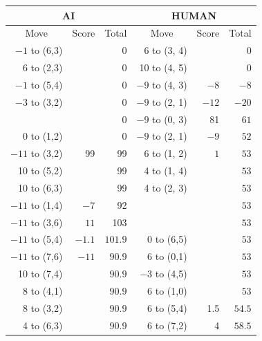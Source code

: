 \begin{appendices}
\begin{table}[H]
    \centering
    \begin{tabular}{rrrrrr}
        \hline
        \multicolumn{3}{c}{AI}        & \multicolumn{3}{c}{HUMAN}     \\ \hline
        \multicolumn{1}{c}{Move}         & \multicolumn{1}{c}{Score} & \multicolumn{1}{c}{Total} & \multicolumn{1}{c}{Move}         & \multicolumn{1}{c}{Score} & \multicolumn{1}{c}{Total} \\ \hline
          $-1$ to (6,3) &     &  0    &   6 to (3, 4) &      &  0    \\ \hline
          6 to (2,3) &     &  0    &   10 to (4, 5) &      &  0    \\ \hline
         $-1$ to (5,4) &     &  0    &  $-9$ to (4, 3) & $-8$   &  $-8$    \\ \hline
         $-3$ to (3,2) &     &  0    &  $-9$ to (2, 1) & $-12$   &  $-20$    \\ \hline
                      &     &  0    &  $-9$ to (0, 3) & 81   &  $61$    \\ \hline
          0 to (1,2) &      &  0    &  $-9$ to (2, 1) & $-9$   &  $52$    \\ \hline
          $-11$ to (3,2) &  99 &  99    & 6 to (1, 2) & $1$   &  $53$    \\ \hline
          10 to (5,2) &   &  99       & 4 to (1, 4) &    &  $53$    \\ \hline
          10 to (6,3) &   &  99       & 4 to (2, 3) &    &  $53$    \\ \hline
         $-11$ to (1,4) & $-7$   &  92  &            &    &  $53$    \\ \hline
         $-11$ to (3,6) & $11$   &  103  &            &    &  $53$    \\ \hline
         $-11$ to (5,4) & $-1.1$   &  $101.9$  & 0 to (6,5)      &    &  $53$    \\ \hline
         $-11$ to (7,6) & $-11$   &  $90.9$  & 6 to (0,1)      &    &  $53$    \\ \hline
          10 to (7,4) &    &  $90.9$  & $-3$ to (4,5)      &    &  $53$    \\ \hline
          8 to (4,1) &    &  $90.9$  & $6$ to (1,0)      &    &  $53$    \\ \hline
          8 to (3,2) &    &  $90.9$  & $6$ to (5,4)      & 1.5    &  $54.5$    \\ \hline
          4 to (6,3) &    &  $90.9$  & $6$ to (7,2)      & 4    &  $58.5$    \\ \hline

\end{tabular}
\end{table}
\end{appendices}
